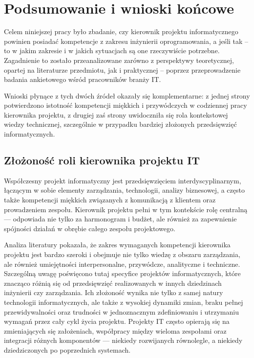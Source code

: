 \newpage
\section{Podsumowanie i wnioski końcowe}

Celem niniejszej pracy było zbadanie, czy kierownik projektu informatycznego powinien posiadać kompetencje z zakresu inżynierii oprogramowania, a jeśli tak – to w jakim zakresie i w jakich sytuacjach są one rzeczywiście potrzebne. Zagadnienie to zostało przeanalizowane zarówno z perspektywy teoretycznej, opartej na literaturze przedmiotu, jak i praktycznej – poprzez przeprowadzenie badania ankietowego wśród pracowników branży IT. 

Wnioski płynące z tych dwóch źródeł okazały się komplementarne: z jednej strony potwierdzono istotność kompetencji miękkich i przywódczych w codziennej pracy kierownika projektu, z drugiej zaś strony uwidoczniła się rola kontekstowej wiedzy technicznej, szczególnie w przypadku bardziej złożonych przedsięwzięć informatycznych.

\subsection{Złożoność roli kierownika projektu IT}

Współczesny projekt informatyczny jest przedsięwzięciem interdyscyplinarnym, łączącym w sobie elementy zarządzania, technologii, analizy biznesowej, a często także kompetencji miękkich związanych z komunikacją z klientem oraz prowadzeniem zespołu. Kierownik projektu pełni w tym kontekście rolę centralną — odpowiada nie tylko za harmonogram i budżet, ale również za zapewnienie spójności działań w obrębie całego zespołu projektowego.

Analiza literatury pokazała, że zakres wymaganych kompetencji kierownika projektu jest bardzo szeroki i obejmuje nie tylko wiedzę z obszaru zarządzania, ale również umiejętności interpersonalne, przywódcze, analityczne i techniczne. Szczególną uwagę poświęcono tutaj specyfice projektów informatycznych, które znacząco różnią się od przedsięwzięć realizowanych w innych dziedzinach inżynierii czy zarządzania. Ich złożoność wynika nie tylko z samej natury technologii informatycznych, ale także z wysokiej dynamiki zmian, braku pełnej przewidywalności oraz trudności w jednoznacznym zdefiniowaniu i utrzymaniu wymagań przez cały cykl życia projektu. Projekty IT często opierają się na zmieniających się założeniach, współpracy między wieloma zespołami oraz integracji różnych komponentów — niekiedy rozwijanych równolegle, a niekiedy dziedziczonych po poprzednich systemach. 

